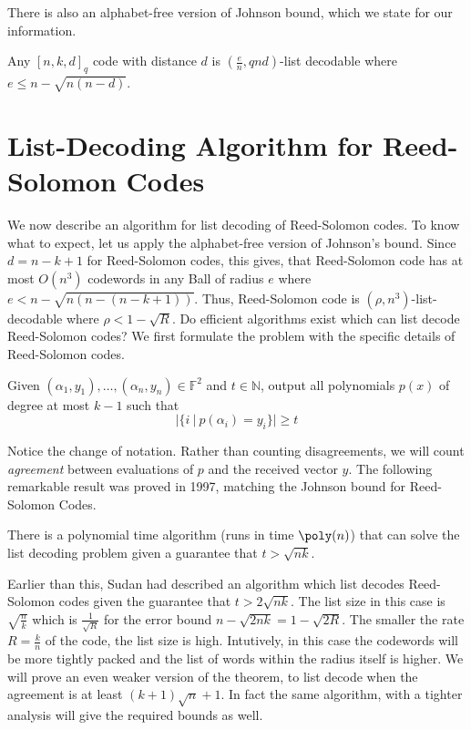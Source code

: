 There is also an alphabet-free version of Johnson bound, which we state for our information.
\begin{theorem}
Any $[n,k,d]_q$ code with distance $d$ is $(\frac{e}{n},qnd)$-list decodable where $e \le n-\sqrt{n(n-d)}$.
\end{theorem}

\section{List-Decoding Algorithm for Reed-Solomon Codes}

We now describe an algorithm for list decoding of Reed-Solomon codes. To know what to expect, let us apply the alphabet-free version of Johnson's bound. Since $d=n-k+1$ for Reed-Solomon codes, this gives, that Reed-Solomon code has at most $O(n^3)$ codewords in any Ball of radius $e$ where $e < n - \sqrt{n(n-(n-k+1))}$. Thus, Reed-Solomon code is $(\rho,n^3)$-list-decodable where $\rho < 1 - \sqrt{R}$. Do efficient algorithms exist which can list decode Reed-Solomon codes? We first formulate the problem with the specific details of Reed-Solomon codes.

\begin{problem}
Given $(\alpha_1, y_1),\ldots, (\alpha_n,y_n) \in \mathbb{F}^2$ and  $t\in \mathbb{N}$,  output all polynomials $p(x)$ of  degree at most $k-1$ such that
\[|\{i~|~p(\alpha_i)=y_i\}|\ge t \]
\end{problem}

Notice the change of notation. Rather than counting disagreements, we will count \textit{agreement} between evaluations of $p$ and the received vector $y$. The following remarkable result was proved in 1997, matching the Johnson bound for Reed-Solomon Codes.

\begin{theorem}
There is a polynomial time algorithm (runs in time $\poly(n)$) that can solve the list decoding problem given a guarantee that $t > \sqrt{nk}$. 
\end{theorem}

Earlier than this, Sudan had described an algorithm which list decodes Reed-Solomon codes given the guarantee that $t > 2\sqrt{nk}$. The list size in this case is $\sqrt{\frac{n}{k}}$ which is
$\frac{1}{\sqrt{R}}$ for the error bound $n-\sqrt{2nk} = 1-\sqrt{2R}$. The smaller the rate $R = \frac{k}{n}$ of the code, the list size is high. Intutively, in this case the codewords will be more tightly packed and the list of words within the radius itself is higher. We will prove an even weaker version of the theorem, to list decode when the agreement is at least $(k+1)\sqrt{n}+1$. In fact the same algorithm, with a tighter analysis will give the required bounds as well.
\vspace{-4mm}
